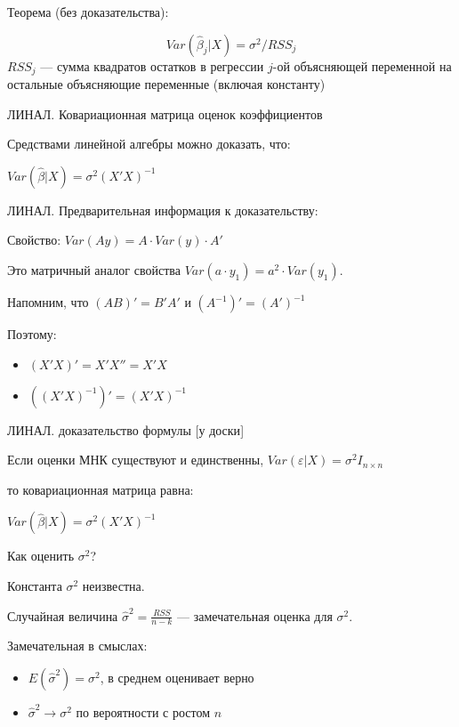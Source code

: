 \documentclass[ignorenonframetext,]{beamer}
\begin{document}
\begin{frame}{Теорема (без доказательства):}

\[
Var(\hat{\beta}_j| X)=\sigma^2/RSS_j
\] \(RSS_j\) --- сумма квадратов остатков в регрессии \(j\)-ой
объясняющей переменной на остальные объясняющие переменные (включая
константу)

\end{frame}

\begin{frame}{ЛИНАЛ. Ковариационная матрица оценок коэффициентов}

Средствами линейной алгебры можно доказать, что:

\(Var(\hat{\beta}|X)=\sigma^2 (X'X)^{-1}\)

\end{frame}

\begin{frame}{ЛИНАЛ. Предварительная информация к доказательству:}

Свойство: \(Var(Ay)=A\cdot Var(y) \cdot A'\)

Это матричный аналог свойства \(Var(a\cdot y_1)=a^2\cdot Var(y_1)\).

Напомним, что \((AB)'=B'A'\) и \((A^{-1})'=(A')^{-1}\)

Поэтому:

\begin{itemize}
\item
  \((X'X)'=X'X''=X'X\)
\item
  \(((X'X)^{-1})'=(X'X)^{-1}\)
\end{itemize}

\end{frame}

\begin{frame}{ЛИНАЛ. доказательство формулы {[}у доски{]}}

Если оценки МНК существуют и единственны,
\(Var(\varepsilon|X)=\sigma^2 I_{n\times n}\)

то ковариационная матрица равна:

\(Var(\hat{\beta}|X)=\sigma^2 (X'X)^{-1}\)

\end{frame}

\begin{frame}{Как оценить \(\sigma^2\)?}

Константа \(\sigma^2\) неизвестна.

Случайная величина \(\hat{\sigma}^2=\frac{RSS}{n-k}\) --- замечательная
оценка для \(\sigma^2\).

Замечательная в смыслах:

\begin{itemize}
\item
  \(E(\hat{\sigma}^2)=\sigma^2\), в среднем оценивает верно
\item
  \(\hat{\sigma}^2 \to \sigma^2\) по вероятности с ростом \(n\)
\end{itemize}

\end{frame}
\end{document}
